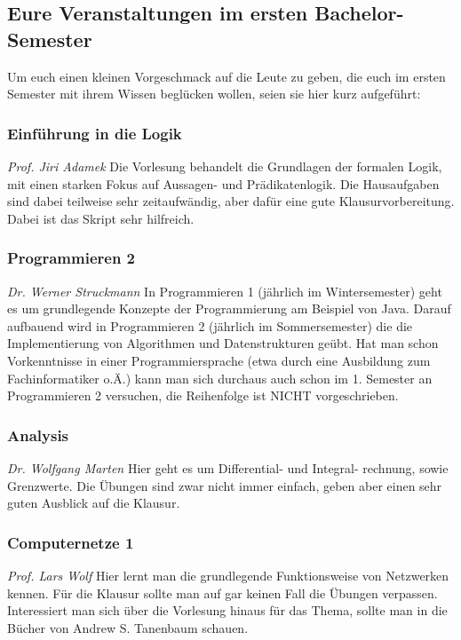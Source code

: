 \begin{multicols}{2}
\subsection{Eure Veranstaltungen im ersten Bachelor-Semester}
	Um euch einen kleinen Vorgeschmack auf die Leute zu geben, die euch im ersten Semester mit ihrem Wissen beglücken wollen, seien sie hier kurz aufgeführt:

\subsubsection{Einführung in die Logik}
	\textit{Prof. Jiri Adamek}
	Die Vorlesung behandelt die Grundlagen der formalen Logik, mit einen starken Fokus auf Aussagen- und Prädikatenlogik. Die Hausaufgaben sind dabei teilweise sehr zeitaufwändig, aber dafür eine gute Klausurvorbereitung. Dabei ist das Skript sehr hilfreich.

\subsubsection{Programmieren 2}
	\textit{Dr. Werner Struckmann}
	In Programmieren 1 (jährlich im Wintersemester) geht es um grundlegende Konzepte der Programmierung am Beispiel von Java. Darauf aufbauend wird in Programmieren 2 (jährlich im Sommersemester) die die Implementierung von Algorithmen und Datenstrukturen geübt. Hat man schon Vorkenntnisse in einer Programmiersprache (etwa durch eine Ausbildung zum Fachinformatiker o.Ä.) kann man sich durchaus auch schon im 1. Semester an Programmieren 2 versuchen, die Reihenfolge ist NICHT vorgeschrieben.

\subsubsection{Analysis}
	\textit{Dr. Wolfgang Marten}
	Hier geht es um Differential- und Integral- rechnung, sowie Grenzwerte. Die Übungen sind zwar nicht immer einfach, geben aber einen sehr guten Ausblick auf die Klausur.

\subsubsection{Computernetze 1}
	\textit{Prof. Lars Wolf}
	Hier lernt man die grundlegende Funktionsweise von Netzwerken kennen. Für die Klausur sollte man auf gar keinen Fall die Übungen verpassen. Interessiert man sich über die Vorlesung hinaus für das Thema, sollte man in die Bücher von Andrew S. Tanenbaum schauen.

\end{multicols}
